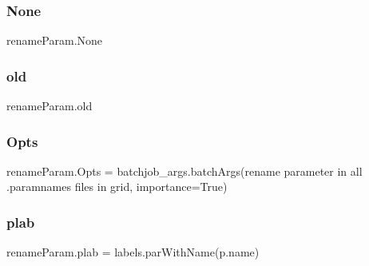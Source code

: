 \subsubsection{\texorpdfstring{None}{None}}
{\footnotesize\ttfamily rename\+Param.\+None}

\mbox{\label{namespacerenameParam_abf75c58da9b3087533cb03ba79355a98}} 
\subsubsection{\texorpdfstring{old}{old}}
{\footnotesize\ttfamily rename\+Param.\+old}

\mbox{\label{namespacerenameParam_aecad79c1e5ebda47e34455d67eff274f}} 
\subsubsection{\texorpdfstring{Opts}{Opts}}
{\footnotesize\ttfamily rename\+Param.\+Opts = batchjob\+\_\+args.\+batch\+Args(\textquotesingle{}rename parameter in all .paramnames files in grid\textquotesingle{}, importance=True)}

\mbox{\label{namespacerenameParam_a9bbf2dcce964e369b659ffe2a93885a2}} 
\subsubsection{\texorpdfstring{plab}{plab}}
{\footnotesize\ttfamily rename\+Param.\+plab = labels.\+par\+With\+Name(p.\+name)}

